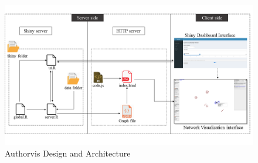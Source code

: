 
\begin{figure}
\centering
\includegraphics[scale=0.68, trim={0 2cm 0.5cm 2cm}]{Chapters/authorvis/programmerView}
\caption{Authorvis Design and Architecture}
\label{av_design}
\end{figure}
%

